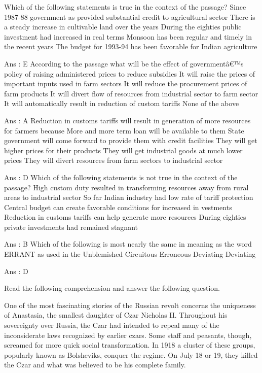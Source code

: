     Which of the following statements is true in the context of the passage?
        Since 1987-88 government as provided substantial credit to agricultural sector
        There is a steady increase in cultivable land over the years
        During the eighties public investment had increased in real terms
        Monsoon has been regular and timely in the recent years
        The budget for 1993-94 has been favorable for Indian agriculture 

    Ans : E
    According to the passage what will be the effect of governmentâ€™s policy of raising administered prices to reduce subsidies
        It will raise the prices of important inputs used in farm sectors
        It will reduce the procurement prices of farm products
        It will divert flow of resources from industrial sector to farm sector
        It will automatically result in reduction of custom tariffs
        None of the above 

    Ans : A
    Reduction in customs tariffs will result in generation of more resources for farmers because
        More and more term loan will be available to them
        State government will come forward to provide them with credit facilities
        They will get higher prices for their products
        They will get industrial goods at much lower prices
        They will divert resources from farm sectors to industrial sector 

    Ans : D
    Which of the following statements is not true in the context of the passage?
        High custom duty resulted in transforming resources away from rural areas to industrial sector
        So far Indian industry had low rate of tariff protection
        Central budget can create favorable conditions for increased in vestments
        Reduction in customs tariffs can help generate more resources
        During eighties private investments had remained stagnant 

    Ans : B
    Which of the following is most nearly the same in meaning as the word ERRANT as used in the
        Unblemished
        Circuitous
        Erroneous
        Deviating
        Deviating 

    Ans : D 


Read the following comprehension and answer the following question.

    One of the most fascinating stories of the Russian revolt concerns the uniqueness of Anastasia, the smallest daughter of Czar Nicholas II. Throughout his sovereignty over Russia, the Czar had intended to repeal many of the inconsiderate laws recognized by earlier czars. Some staff and peasants, though, screamed for more quick social transformation. In 1918 a cluster of these groups, popularly known as Bolsheviks, conquer the regime. On July 18 or 19, they killed the Czar and what was believed to be his complete family.

